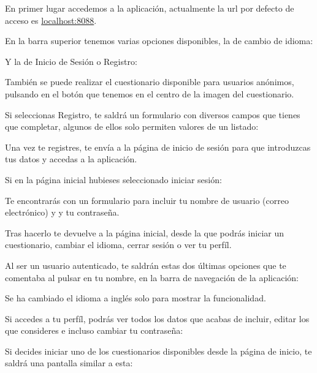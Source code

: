 En primer lugar accedemos a la aplicación, actualmente la url por defecto de acceso es \url{localhost:8088}.


En la barra superior tenemos varias opciones disponibles, la de cambio de idioma:


Y la de Inicio de Sesión o Registro:


También se puede realizar el cuestionario disponible para usuarios anónimos, pulsando en el botón que tenemos en el centro de la imagen del cuestionario.

Si seleccionas Registro, te saldrá un formulario con diversos campos que tienes que completar, algunos de ellos solo permiten valores de un listado:


Una vez te registres, te envía a la página de inicio de sesión para que introduzcas tus datos y accedas a la aplicación.

Si en la página inicial hubieses seleccionado iniciar sesión:


Te encontrarás con un formulario para incluir tu nombre de usuario (correo electrónico) y y tu contraseña. 

Tras hacerlo te devuelve a la página inicial, desde la que podrás iniciar un cuestionario, cambiar el idioma, cerrar sesión o ver tu perfíl.

Al ser un usuario autenticado, te saldrán estas dos últimas opciones que te comentaba al pulsar en tu nombre, en la barra de navegación de la aplicación:


Se ha cambiado el idioma a inglés solo para mostrar la funcionalidad.

Si accedes a tu perfíl, podrás ver todos los datos que acabas de incluir, editar los que consideres e incluso cambiar tu contraseña:


Si decides iniciar uno de los cuestionarios disponibles desde la página de inicio, te saldrá una pantalla similar a esta:

